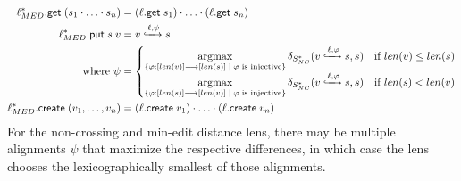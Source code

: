 \documentclass[acmsmall,review,anonymous]{acmart}\settopmatter{printfolios=true,printccs=false,printacmref=false}
\theoremstyle{definition}
\newcommand{\kw}[1]{\ensuremath{\mathsf{#1}}\xspace}
\newcommand{\get}{\ensuremath{\kw{get}}\xspace}
\newcommand{\pput}{\ensuremath{\kw{put}}\xspace}
\newcommand{\create}{\ensuremath{\kw{create}}\xspace}
\DeclareMathOperator*{\argmax}{argmax}
\begin{document}
\begin{align*}
\ell^*_{MED}.\get \; (s_1 \cdot  \ldots \cdot s_n) &= (\ell.\get \; s_1)
\cdot \ldots \cdot (\ell.\get \; s_n)\\
\ell^*_{MED}.\pput \; s \; v
&= v \xhookrightarrow{\ell, \psi} s\\
\text{where } \psi &= \begin{cases}
\argmax \limits_{\{\varphi : [len(v)] \longrightarrow [len(s)] \; | \; \varphi \text{ is injective}\}} \delta_{S^*_{NC}}(v \xhookrightarrow{\ell, \varphi} s, s) & \text{if } len(v) \leq len(s)\\
\argmax \limits_{\{\varphi : [len(s)] \longrightarrow [len(v)] \; | \; \varphi \text{ is injective}\}} \delta_{S^*_{NC}}(v \xhookrightarrow{\ell, \varphi} s, s) & \text{if } len(s) < len(v)
\end{cases}\\
\ell^*_{MED}.\create \; (v_1, \ldots, v_n) &= (\ell.\create \;
v_1) \cdot \ldots \cdot (\ell.\create \; v_n)
\end{align*}
For the non-crossing and min-edit distance lens, there may be multiple alignments $\psi$ that maximize the respective differences, in which case the lens chooses the lexicographically smallest of those alignments.
\end{document}
